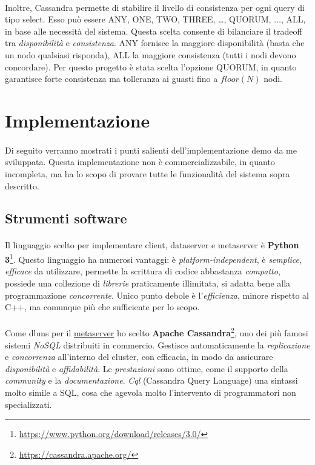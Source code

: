 \documentclass[11pt,a4paper,english]{article}
\begin{document}
\paragraph{} Inoltre, Cassandra permette di stabilire il livello di consistenza\cite{conslevel} per ogni query di tipo select. Esso può essere ANY, ONE, TWO, THREE, \dots, QUORUM, $\dots$, ALL, in base alle necessità del sistema. Questa scelta consente di bilanciare il tradeoff tra \emph{disponibilità} e \emph{consistenza}. ANY fornisce la maggiore disponibilità (basta che un nodo qualsiasi risponda), ALL la maggiore consistenza (tutti i nodi devono concordare). Per questo progetto è stata scelta l'opzione QUORUM, in quanto garantisce forte consistenza ma tolleranza ai guasti fino a $floor(N)$ nodi. 


\section{Implementazione}

\paragraph{} Di seguito verranno mostrati i punti salienti dell'implementazione demo da me sviluppata. Questa implementazione non è commercializzabile, in quanto incompleta, ma ha lo scopo di provare tutte le funzionalità del sistema sopra descritto. 

\subsection{Strumenti software}

\paragraph{} Il linguaggio scelto per implementare client, dataserver e metaserver è \textbf{Python 3}\footnote{\url{https://www.python.org/download/releases/3.0/}}. Questo linguaggio ha numerosi vantaggi: è \emph{platform-independent}, è \emph{semplice}, \emph{efficace} da utilizzare, permette la scrittura di codice abbastanza \emph{compatto}, possiede una collezione di \emph{librerie} praticamente illimitata, si adatta bene alla programmazione \emph{concorrente}. Unico punto debole è l'\emph{efficienza}, minore rispetto al C++, ma comunque più che sufficiente per lo scopo. 

\paragraph{} Come dbms per il \underline{metaserver} ho scelto \textbf{Apache Cassandra}\footnote{\url{https://cassandra.apache.org/}}, uno dei più famosi sistemi \emph{NoSQL} distribuiti in commercio. Gestisce automaticamente la \emph{replicazione} e \emph{concorrenza} all'interno del cluster, con efficacia, in modo da assicurare \emph{disponibilità} e \emph{affidabilità}. Le \emph{prestazioni} sono ottime, come il supporto della \emph{community} e la \emph{documentazione}. \emph{Cql} (Cassandra Query Language) una sintassi molto simile a SQL, cosa che agevola molto l'intervento di programmatori non specializzati.  
\end{document}
